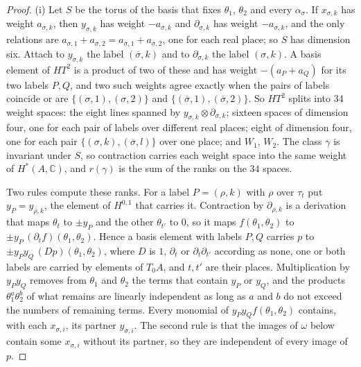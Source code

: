 \documentclass[11pt,reqno]{amsart}
\theoremstyle{plain}
\theoremstyle{definition}
\theoremstyle{remark}
\newcommand{\CC}{\mathbb{C}}
\newcommand{\bbar}[1]{\overline{#1}}
\begin{document}
\begin{proof}
(i) Let $S$ be the torus of the basis that fixes $\theta_{1}$, $\theta_{2}$
and every $\alpha_{\sigma}$. If $x_{\sigma,k}$ has weight $a_{\sigma,k}$, then
$y_{\sigma,k}$ has weight $-a_{\bbar\sigma,k}$ and $\partial_{\sigma,k}$ has
weight $-a_{\sigma,k}$, and the only relations are
$a_{\sigma,1}+a_{\sigma,2}=a_{\bbar\sigma,1}+a_{\bbar\sigma,2}$, one for each
real place; so $S$ has dimension six. Attach to $y_{\sigma,k}$ the label
$(\bbar\sigma,k)$ and to $\partial_{\sigma,k}$ the label $(\sigma,k)$. A basis
element of $HT^{2}$ is a product of two of these and has weight
$-(a_{P}+a_{Q})$ for its two labels $P,Q$, and two such weights agree exactly
when the pairs of labels coincide or are $\{(\sigma,1),(\sigma,2)\}$ and
$\{(\bbar\sigma,1),(\bbar\sigma,2)\}$. So $HT^{2}$ splits into $34$ weight
spaces: the eight lines spanned by $y_{\sigma,k}\otimes
\partial_{\bbar\sigma,k}$; sixteen spaces of dimension four, one for each
pair of labels over different real places; eight of dimension four, one for
each pair $\{(\sigma,k),(\bbar\sigma,l)\}$ over one place; and $W_{1}$,
$W_{2}$. The class $\gamma$ is invariant under $S$, so contraction carries
each weight space into the same weight of $H^{*}(A,\CC)$, and $r(\gamma)$ is
the sum of the ranks on the $34$ spaces.

Two rules compute these ranks. For a label $P=(\rho,k)$ with $\rho$ over
$\tau_{t}$ put $y_{P}=y_{\bbar\rho,k}$, the element of $H^{0,1}$ that carries
it. Contraction by $\partial_{\rho,k}$ is a derivation that maps $\theta_{t}$ to
$\pm y_{P}$ and the other $\theta_{t'}$ to $0$, so it maps $f(\theta_{1},
\theta_{2})$ to $\pm y_{P}\,(\partial_{t}f)(\theta_{1},\theta_{2})$. Hence a basis
element with labels $P,Q$ carries $p$ to $\pm y_{P}y_{Q}\,(Dp)(\theta_{1},
\theta_{2})$, where $D$ is $1$, $\partial_{t}$ or $\partial_{t}\partial_{t'}$
according as none, one or both labels are carried by elements of $T_{0}A$, and
$t,t'$ are their places. Multiplication by $y_{P}y_{Q}$ removes from
$\theta_{1}$ and $\theta_{2}$ the terms that contain $y_{P}$ or $y_{Q}$, and
the products $\theta_{1}^{a}\theta_{2}^{b}$ of what remains are linearly
independent as long as $a$ and $b$ do not exceed the numbers of remaining
terms. Every monomial of $y_{P}y_{Q}f(\theta_{1},\theta_{2})$ contains, with
each $x_{\sigma,i}$, its partner $y_{\bbar\sigma,i}$. The second rule is that
the images of $\omega$ below contain some $x_{\sigma,i}$ without its partner,
so they are independent of every image of $p$.


\end{proof}
\end{document}
